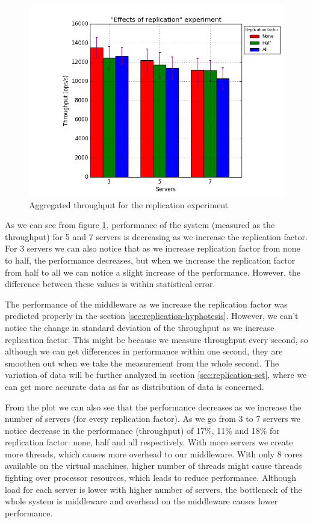 \documentclass[11pt]{article}
\begin{document}
\begin{figure}
\centering
	\includegraphics[width=0.7\linewidth]{plots/replication}

\caption{Aggregated throughput for the replication experiment}
\label{fig:replication-overall}
\end{figure}


As we can see from figure \ref{fig:replication-overall}, performance of the system (measured as the throughput) for 5 and 7 servers is decreasing as we increase the replication factor. For 3 servers we can also notice that as we increase replication factor from none to half, the performance decreases, but when we increase the replication factor from half to all we can notice a slight increase of the performance. However, the difference between these values is within statistical error.

The performance of the middleware as we increase the replication factor was predicted properly in the section \ref{sec:replication-hyphotesis}. However, we can't notice the change in standard deviation of the throughput as we increase replication factor. This might be because we measure throughput every second, so although we can get differences in performance within one second, they are smoothen out when we take the measurement from the whole second. The variation of data will be further analyzed in section \ref{sec:replication-set}, where we can get more accurate data as far as distribution of data is concerned.

From the plot we can also see that the performance decreases as we increase the number of servers (for every replication factor). As we go from 3 to 7 servers we notice decrease in the performance (throughput) of 17\%, 11\% and 18\% for replication factor: none, half and all respectively. With more servers we create more threads, which causes more overhead to our middleware. With only 8 cores available on the virtual machines, higher number of threads might cause threads fighting over processor resources, which leads to reduce performance. Although load for each server is lower with higher number of servers, the bottleneck of the whole system is middleware and overhead on the middleware causes lower performance.
\end{document}
